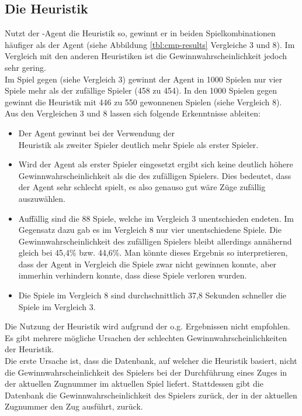 \subsection{Die Heuristik }
\label{fz:h_smc}
\authorpatrick
Nutzt der \mxZitat{\abp}-Agent die  Heuristik so, gewinnt er in beiden Spielkombinationen häufiger als der  Agent (siehe Abbildung \ref{tbl:cmp-results} Vergleiche 3 und 8). Im Vergleich mit den anderen Heuristiken ist die Gewinnwahrscheinlichkeit jedoch sehr gering.
\\Im Spiel  gegen  (siehe Vergleich 3) gewinnt der Agent in 1000 Spielen nur vier Spiele mehr als der zufällige Spieler (458 zu 454). In den 1000 Spielen  gegen  gewinnt die Heuristik mit 446 zu 550 gewonnenen Spielen (siehe Vergleich 8).
\\Aus den Vergleichen 3 und 8 lassen sich folgende Erkenntnisse ableiten:
\begin{itemize}
\item Der Agent \mxZitat{\abp} gewinnt bei der Verwendung der \\ Heuristik als zweiter Spieler deutlich mehr Spiele als erster Spieler.
\item Wird der Agent als erster Spieler eingesetzt ergibt sich keine deutlich höhere Gewinnwahrscheinlichkeit als die des zufälligen Spielers. Dies bedeutet, dass der Agent sehr schlecht spielt, es also genauso gut wäre Züge zufällig auszuwählen. 
\item Auffällig sind die 88 Spiele, welche im Vergleich 3 unentschieden endeten. Im Gegensatz dazu gab es im Vergleich 8 nur vier unentschiedene Spiele. Die Gewinnwahrscheinlichkeit des zufälligen Spielers bleibt allerdings annähernd gleich bei 45,4\% bzw. 44,6\%. Man könnte dieses Ergebnis so interpretieren, dass der Agent in Vergleich die Spiele zwar nicht gewinnen konnte, aber immerhin verhindern konnte, dass diese Spiele verloren wurden.
\item Die Spiele im Vergleich 8 sind durchschnittlich 37,8 Sekunden schneller die Spiele im Vergleich 3.
\end{itemize}
Die Nutzung der Heuristik  wird aufgrund der o.g. Ergebnissen nicht empfohlen.
\\Es gibt mehrere mögliche Ursachen der schlechten Gewinnwahrscheinlichkeiten der Heuristik.
\vspace{0.5cm}
\\Die erste Ursache ist, dass die Datenbank, auf welcher die Heuristik basiert, nicht die Gewinnwahrscheinlichkeit des Spielers bei der Durchführung eines Zuges in der aktuellen Zugnummer im aktuellen Spiel liefert. Stattdessen gibt die Datenbank die Gewinnwahrscheinlichkeit des Spielers zurück, der in der aktuellen Zugnummer den Zug ausführt, zurück.
